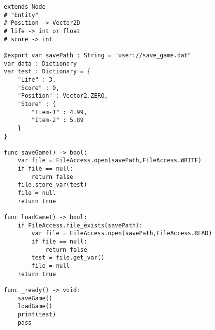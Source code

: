 \documentclass{article}
\begin{document}
\begin{verbatim}
extends Node
# "Entity"
# Position -> Vector2D
# life -> int or float
# score -> int

@export var savePath : String = "user://save_game.dat"
var data : Dictionary
var test : Dictionary = {
	"Life" : 3,
	"Score" : 0,
	"Position" : Vector2.ZERO,
	"Store" : {
		"Item-1" : 4.99,
		"Item-2" : 5.89
	}
}

func saveGame() -> bool:
	var file = FileAccess.open(savePath,FileAccess.WRITE)
	if file == null:
		return false
	file.store_var(test)
	file = null
	return true

func loadGame() -> bool:
	if FileAccess.file_exists(savePath):
		var file = FileAccess.open(savePath,FileAccess.READ)
		if file == null:
			return false
		test = file.get_var()
		file = null
	return true

func _ready() -> void:
	saveGame()
	loadGame()
	print(test)
	pass

\end{verbatim}
\end{document}
